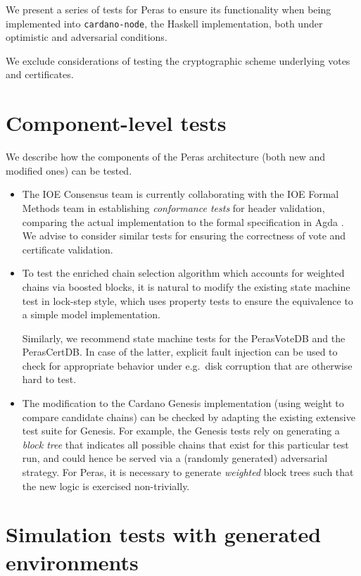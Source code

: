 We present a series of tests for Peras to ensure its functionality when being implemented into \texttt{cardano-node}, the Haskell implementation, both under optimistic and adversarial conditions.

We exclude considerations of testing the cryptographic scheme underlying votes and certificates.

\section{Component-level tests}

We describe how the components of the Peras architecture (both new and modified ones) can be tested.

\begin{itemize}
\item
  The IOE Consensus team is currently collaborating with the IOE Formal Methods team in establishing \emph{conformance tests} for header validation, comparing the actual implementation to the formal specification in Agda \parencite{chapman2024applying}.
  We advise to consider similar tests for ensuring the correctness of vote and certificate validation.
\item
  To test the enriched chain selection algorithm which accounts for weighted chains via boosted blocks, it is natural to modify the existing state machine test in lock-step style, which uses property tests to ensure the equivalence to a simple model implementation.

  Similarly, we recommend state machine tests for the PerasVoteDB and the PerasCertDB\@.
  In case of the latter, explicit fault injection can be used to check for appropriate behavior under e.g.~disk corruption that are otherwise hard to test.
\item
  The modification to the Cardano Genesis implementation (using weight to compare candidate chains) can be checked by adapting the existing extensive test suite for Genesis.
  For example, the Genesis tests rely on generating a \emph{block tree} that indicates all possible chains that exist for this particular test run, and could hence be served via a (randomly generated) adversarial strategy.
  For Peras, it is necessary to generate \emph{weighted} block trees such that the new logic is exercised non-trivially.
\end{itemize}

\section{Simulation tests with generated environments}

